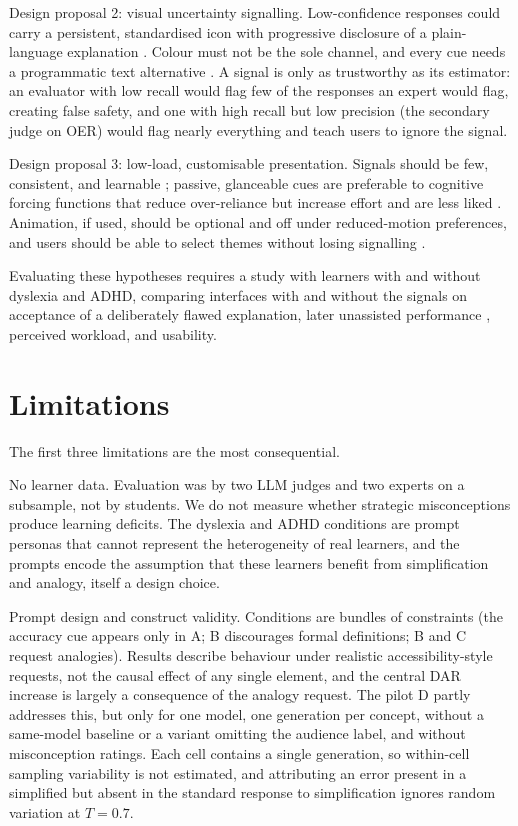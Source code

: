 \documentclass[journal,article,submit,pdftex,moreauthors]{Definitions/mdpi}
\begin{document}
Design proposal 2: visual uncertainty signalling. Low-confidence responses could carry a persistent, standardised icon with progressive disclosure of a plain-language explanation \cite{treisman1980feature}. Colour must not be the sole channel, and every cue needs a programmatic text alternative \cite{w3c2023wcag}. A signal is only as trustworthy as its estimator: an evaluator with low recall would flag few of the responses an expert would flag, creating false safety, and one with high recall but low precision (the secondary judge on OER) would flag nearly everything and teach users to ignore the signal.

Design proposal 3: low-load, customisable presentation. Signals should be few, consistent, and learnable \cite{sweller1998cognitive}; passive, glanceable cues are preferable to cognitive forcing functions that reduce over-reliance but increase effort and are less liked \cite{bucinca2021trust}. Animation, if used, should be optional and off under reduced-motion preferences, and users should be able to select themes without losing signalling \cite{rose2002teaching, wobbrock2011ability}.

Evaluating these hypotheses requires a study with learners with and without dyslexia and ADHD, comparing interfaces with and without the signals on acceptance of a deliberately flawed explanation, later unassisted performance \cite{bastani2025generative}, perceived workload, and usability.

\section{Limitations}
\label{sec:limitations}

The first three limitations are the most consequential.

No learner data. Evaluation was by two LLM judges and two experts on a subsample, not by students. We do not measure whether strategic misconceptions produce learning deficits. The dyslexia and ADHD conditions are prompt personas that cannot represent the heterogeneity of real learners, and the prompts encode the assumption that these learners benefit from simplification and analogy, itself a design choice.

Prompt design and construct validity. Conditions are bundles of constraints (the accuracy cue appears only in A; B discourages formal definitions; B and C request analogies). Results describe behaviour under realistic accessibility-style requests, not the causal effect of any single element, and the central DAR increase is largely a consequence of the analogy request. The pilot D partly addresses this, but only for one model, one generation per concept, without a same-model baseline or a variant omitting the audience label, and without misconception ratings. Each cell contains a single generation, so within-cell sampling variability is not estimated, and attributing an error present in a simplified but absent in the standard response to simplification ignores random variation at $T = 0.7$.
\end{document}
